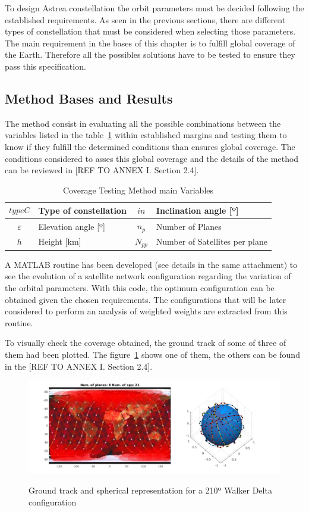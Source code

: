 
To design Astrea constellation the orbit parameters must be decided following the established requirements. As seen in the previous sections, there are different types of constellation that must be considered when selecting those parameters. The main requirement in the bases of this chapter is to fulfill global coverage of the Earth. Therefore all the possibles solutions have to be tested to ensure they pass this specification.

\subsection{Method Bases and Results}
The method consist in evaluating all the possible combinations between the variables listed in the table~\ref{t:CovVar} within established margins and  testing them to know if they fulfill the determined conditions than ensures global coverage. The conditions considered to asses this global coverage and the details of the method can be reviewed in [REF TO ANNEX I. Section 2.4]. %

\begin{table}[H]
\centering
\begin{tabular}{|c|l|c|l|}
\hline
$$typeC$$     & Type of constellation    & $$in$$  & Inclination angle {[}º{]} \\ \hline
$\varepsilon$ & Elevation angle {[}º{]}  & $n_{p}$ & Number of Planes                          \\ \hline
$$h$$         & Height  {[}km{]}  & $N_{pp}$ & Number of Satellites per plane            \\ \hline
\end{tabular}
\caption{Coverage Testing Method main Variables}
\label{t:CovVar}
\end{table}  

A MATLAB routine has been developed (see details in the same attachment) to see the evolution of a satellite network configuration regarding the variation of the orbital parameters. With this code, the optimum configuration can be obtained given the chosen requirements. The configurations that will be later considered to perform an analysis of weighted weights are extracted from this routine.

To visually check the coverage obtained, the ground track of some of three of them had been plotted. The figure~\ref{fig:gt210} shows one of them, the others can be found in the [REF TO ANNEX I. Section 2.4]. 


\begin{figure}[H] %
	\centering
	\includegraphics[width=.8\textwidth]{./testing/WB210.png}\\
	\caption{Ground track and spherical representation for a 210º Walker Delta configuration}
	\label{fig:gt210}
\end{figure}